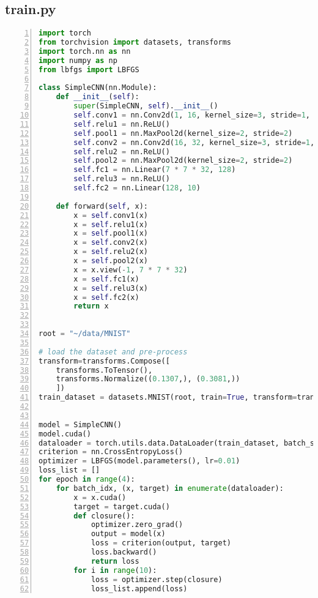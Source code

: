 \subsection*{train.py}
\begin{lstlisting}[language=python,numbers=left]
import torch
from torchvision import datasets, transforms
import torch.nn as nn
import numpy as np
from lbfgs import LBFGS

class SimpleCNN(nn.Module):
    def __init__(self):
        super(SimpleCNN, self).__init__()
        self.conv1 = nn.Conv2d(1, 16, kernel_size=3, stride=1, padding=1)
        self.relu1 = nn.ReLU()
        self.pool1 = nn.MaxPool2d(kernel_size=2, stride=2)
        self.conv2 = nn.Conv2d(16, 32, kernel_size=3, stride=1, padding=1)
        self.relu2 = nn.ReLU()
        self.pool2 = nn.MaxPool2d(kernel_size=2, stride=2)
        self.fc1 = nn.Linear(7 * 7 * 32, 128)
        self.relu3 = nn.ReLU()
        self.fc2 = nn.Linear(128, 10)

    def forward(self, x):
        x = self.conv1(x)
        x = self.relu1(x)
        x = self.pool1(x)
        x = self.conv2(x)
        x = self.relu2(x)
        x = self.pool2(x)
        x = x.view(-1, 7 * 7 * 32)
        x = self.fc1(x)
        x = self.relu3(x)
        x = self.fc2(x)
        return x


root = "~/data/MNIST"

# load the dataset and pre-process
transform=transforms.Compose([
    transforms.ToTensor(),
    transforms.Normalize((0.1307,), (0.3081,))
    ])
train_dataset = datasets.MNIST(root, train=True, transform=transform)


model = SimpleCNN()
model.cuda()
dataloader = torch.utils.data.DataLoader(train_dataset, batch_size=128)
criterion = nn.CrossEntropyLoss()
optimizer = LBFGS(model.parameters(), lr=0.01)
loss_list = []
for epoch in range(4):
    for batch_idx, (x, target) in enumerate(dataloader):
        x = x.cuda()
        target = target.cuda()
        def closure():
            optimizer.zero_grad()
            output = model(x)
            loss = criterion(output, target)
            loss.backward()
            return loss
        for i in range(10):
            loss = optimizer.step(closure)
            loss_list.append(loss)
\end{lstlisting}